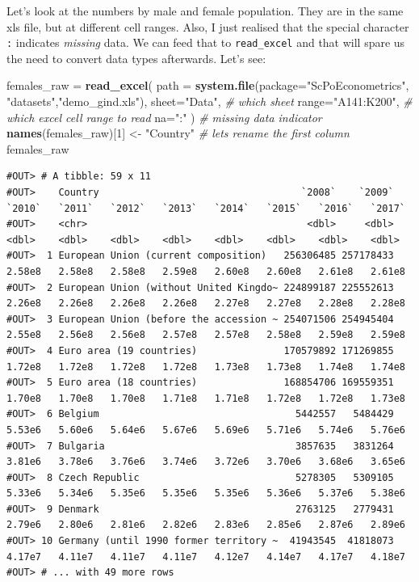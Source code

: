 \documentclass[]{book}
\newenvironment{Shaded}{\begin{snugshade}}{\end{snugshade}}
\newcommand{\CommentTok}[1]{\textcolor[rgb]{0.56,0.35,0.01}{\textit{#1}}}
\newcommand{\DataTypeTok}[1]{\textcolor[rgb]{0.13,0.29,0.53}{#1}}
\newcommand{\DecValTok}[1]{\textcolor[rgb]{0.00,0.00,0.81}{#1}}
\newcommand{\KeywordTok}[1]{\textcolor[rgb]{0.13,0.29,0.53}{\textbf{#1}}}
\newcommand{\NormalTok}[1]{#1}
\newcommand{\StringTok}[1]{\textcolor[rgb]{0.31,0.60,0.02}{#1}}
\begin{document}
Let's look at the numbers by male and female population. They are in the same xls file, but at different cell ranges. Also, I just realised that the special character \texttt{:} indicates \emph{missing} data. We can feed that to \texttt{read\_excel} and that will spare us the need to convert data types afterwards. Let's see:

\begin{Shaded}
\begin{Highlighting}[]
\NormalTok{females_raw =}\StringTok{ }\KeywordTok{read_excel}\NormalTok{(}
                \DataTypeTok{path =} \KeywordTok{system.file}\NormalTok{(}\DataTypeTok{package=}\StringTok{"ScPoEconometrics"}\NormalTok{,}
                                    \StringTok{"datasets"}\NormalTok{,}\StringTok{"demo_gind.xls"}\NormalTok{), }
                \DataTypeTok{sheet=}\StringTok{"Data"}\NormalTok{, }\CommentTok{# which sheet}
                \DataTypeTok{range=}\StringTok{"A141:K200"}\NormalTok{,  }\CommentTok{# which excel cell range to read}
                \DataTypeTok{na=}\StringTok{":"}\NormalTok{ )   }\CommentTok{# missing data indicator}
\KeywordTok{names}\NormalTok{(females_raw)[}\DecValTok{1}\NormalTok{] <-}\StringTok{ "Country"}   \CommentTok{# lets rename the first column}
\NormalTok{females_raw}
\end{Highlighting}
\end{Shaded}

\begin{verbatim}
#OUT> # A tibble: 59 x 11
#OUT>    Country                                   `2008`    `2009`   `2010`   `2011`   `2012`   `2013`   `2014`   `2015`   `2016`   `2017`
#OUT>    <chr>                                      <dbl>     <dbl>    <dbl>    <dbl>    <dbl>    <dbl>    <dbl>    <dbl>    <dbl>    <dbl>
#OUT>  1 European Union (current composition)   256306485 257178433   2.58e8   2.58e8   2.58e8   2.59e8   2.60e8   2.60e8   2.61e8   2.61e8
#OUT>  2 European Union (without United Kingdo~ 224899187 225552613   2.26e8   2.26e8   2.26e8   2.26e8   2.27e8   2.27e8   2.28e8   2.28e8
#OUT>  3 European Union (before the accession ~ 254071506 254945404   2.55e8   2.56e8   2.56e8   2.57e8   2.57e8   2.58e8   2.59e8   2.59e8
#OUT>  4 Euro area (19 countries)               170579892 171269855   1.72e8   1.72e8   1.72e8   1.72e8   1.73e8   1.73e8   1.74e8   1.74e8
#OUT>  5 Euro area (18 countries)               168854706 169559351   1.70e8   1.70e8   1.70e8   1.71e8   1.71e8   1.72e8   1.72e8   1.73e8
#OUT>  6 Belgium                                  5442557   5484429   5.53e6   5.60e6   5.64e6   5.67e6   5.69e6   5.71e6   5.74e6   5.76e6
#OUT>  7 Bulgaria                                 3857635   3831264   3.81e6   3.78e6   3.76e6   3.74e6   3.72e6   3.70e6   3.68e6   3.65e6
#OUT>  8 Czech Republic                           5278305   5309105   5.33e6   5.34e6   5.35e6   5.35e6   5.35e6   5.36e6   5.37e6   5.38e6
#OUT>  9 Denmark                                  2763125   2779431   2.79e6   2.80e6   2.81e6   2.82e6   2.83e6   2.85e6   2.87e6   2.89e6
#OUT> 10 Germany (until 1990 former territory ~  41943545  41818073   4.17e7   4.11e7   4.11e7   4.11e7   4.12e7   4.14e7   4.17e7   4.18e7
#OUT> # ... with 49 more rows
\end{verbatim}
\end{document}
